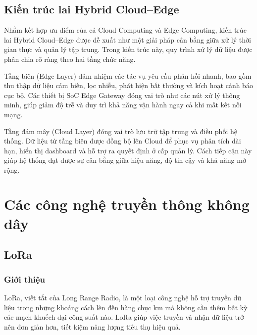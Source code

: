 \subsection{Kiến trúc lai Hybrid Cloud--Edge}

Nhằm kết hợp ưu điểm của cả Cloud Computing và Edge Computing, kiến trúc lai
Hybrid Cloud--Edge được đề xuất như một giải pháp cân bằng giữa xử lý thời gian
thực và quản lý tập trung. Trong kiến trúc này, quy trình xử lý dữ liệu được phân
chia rõ ràng theo hai tầng chức năng.

Tầng biên (Edge Layer) đảm nhiệm các tác vụ yêu cầu phản hồi nhanh, bao gồm thu
thập dữ liệu cảm biến, lọc nhiễu, phát hiện bất thường và kích hoạt cảnh báo cục
bộ. Các thiết bị SoC Edge Gateway đóng vai trò như các nút xử lý thông minh, giúp
giảm độ trễ và duy trì khả năng vận hành ngay cả khi mất kết nối mạng.

Tầng đám mây (Cloud Layer) đóng vai trò lưu trữ tập trung và điều phối hệ thống.
Dữ liệu từ tầng biên được đồng bộ lên Cloud để phục vụ phân tích dài hạn, hiển thị
dashboard và hỗ trợ ra quyết định ở cấp quản lý. Cách tiếp cận này giúp hệ thống
đạt được sự cân bằng giữa hiệu năng, độ tin cậy và khả năng mở rộng.


\section{Các công nghệ truyền thông không dây}
\subsection{LoRa}
\subsubsection{Giới thiệu}
LoRa, viết tắt của Long Range Radio, là một loại công nghệ hỗ trợ truyền dữ liệu trong những khoảng cách lên đến hàng chục km mà không cần thêm bất kỳ các mạch khuếch đại công suất nào. LoRa giúp việc truyền và nhận dữ liệu trở nên đơn giản hơn, tiết kiệm năng lượng tiêu thụ hiệu quả.

